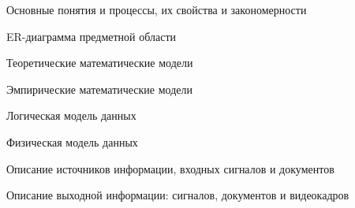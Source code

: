 \documentclass{beamer}
\begin{document}
\begin{frame}
	{Основные понятия и процессы, их свойства и закономерности}
\end{frame}

\begin{frame}
	{ER-диаграмма предметной области}
\end{frame}

\begin{frame}
	{Теоретические математические модели}
\end{frame}

\begin{frame}
	{Эмпирические математические модели}
\end{frame}

\begin{frame}
	{Логическая модель данных}
\end{frame}

\begin{frame}
	{Физическая модель данных}
\end{frame}

\begin{frame}
	{Описание источников информации, входных сигналов и документов}
\end{frame}

\begin{frame}
	{Описание выходной информации: сигналов, документов и видеокадров}
\end{frame}
\end{document}
